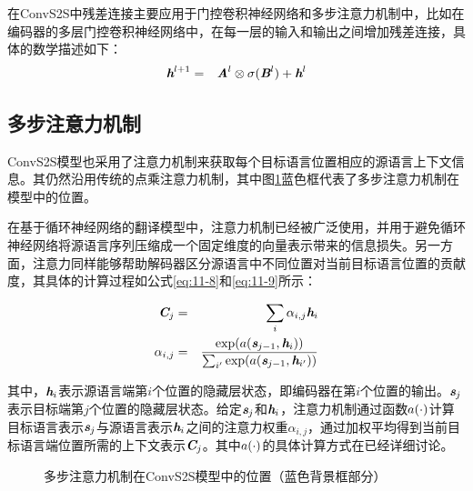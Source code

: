 \parinterval 在ConvS2S中残差连接主要应用于门控卷积神经网络和多步注意力机制中，比如在编码器的多层门控卷积神经网络中，在每一层的输入和输出之间增加残差连接，具体的数学描述如下：
\begin{eqnarray}
\textbf{\em h}^{l+1} &=& \textbf{\em A}^{l} \otimes \sigma ( \textbf{\em B}^{l} ) + \textbf{\em h}^{l}
\label{eq:11-7}
\end{eqnarray}


\subsection{多步注意力机制}

\parinterval ConvS2S模型也采用了注意力机制来获取每个目标语言位置相应的源语言上下文信息。其仍然沿用传统的点乘注意力机制，其中图\ref{fig:11-16}蓝色框代表了多步注意力机制在模型中的位置。

\parinterval 在基于循环神经网络的翻译模型中，注意力机制已经被广泛使用，并用于避免循环神经网络将源语言序列压缩成一个固定维度的向量表示带来的信息损失。另一方面，注意力同样能够帮助解码器区分源语言中不同位置对当前目标语言位置的贡献度，其具体的计算过程如公式\eqref{eq:11-8}和\eqref{eq:11-9}所示：

\begin{eqnarray}
\textbf{\em C}_j &=& \sum_i \alpha_{i,j} \textbf{\em h}_i \label{eq:11-8} \\
\alpha_{i,j} &=& \frac{ \textrm{exp}({a} (\textbf{\em s}_{j-1},\textbf{\em h}_i))  }{\sum_{i'} \textrm{exp}( {a} (\textbf{\em s}_{j-1},\textbf{\em h}_{i'}))} \label{eq:11-9}
\end{eqnarray}

\noindent 其中，$\textbf{\em h}_i$表示源语言端第$i$个位置的隐藏层状态，即编码器在第$i$个位置的输出。$\textbf{\em s}_j$表示目标端第$j$个位置的隐藏层状态。给定$\textbf{\em s}_j$和$\textbf{\em h}_i$，注意力机制通过函数${a}(\cdot)$计算目标语言表示$\textbf{\em s}_j$与源语言表示$\textbf{\em h}_i$之间的注意力权重$\alpha_{i,j}$，通过加权平均得到当前目标语言端位置所需的上下文表示$\textbf{\em C}_j$。其中${a}(\cdot)$的具体计算方式在{\chapterten}已经详细讨论。

\begin{figure}[htp]
\centering

\caption{多步注意力机制在ConvS2S模型中的位置（蓝色背景框部分）}
\label{fig:11-16}
\end{figure}

